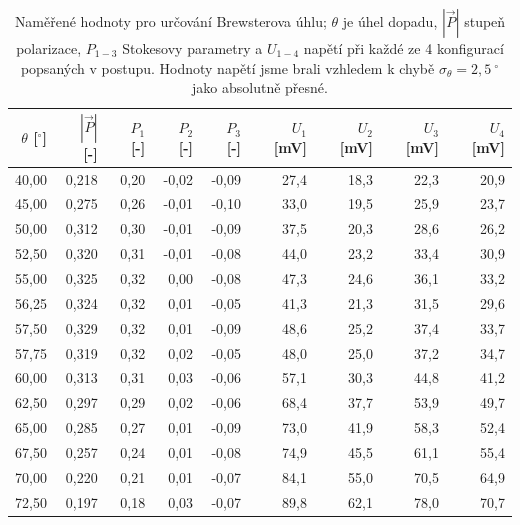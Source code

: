 \documentclass[english]{article}
\newcommand{\unit}[1]{\mathrm{#1}}
\begin{document}
		\begin{table}[htbp]
		  \centering
		    \begin{tabular}{|r|r|r|r|r|r|r|r|r|}
		    \hline
		    \boldmath{}\textbf{$\theta$ [$\unit{^\circ}$]}\unboldmath{} & \boldmath{}\textbf{$|\vec{P}|$ [-]}\unboldmath{} & \boldmath{}\textbf{$P_1$ [-]}\unboldmath{} & \boldmath{}\textbf{$P_2$ [-]}\unboldmath{} & \boldmath{}\textbf{$P_3$ [-]}\unboldmath{} & \boldmath{}\textbf{$U_1$ [mV]}\unboldmath{} & \boldmath{}\textbf{$U_2$ [mV]}\unboldmath{} & \boldmath{}\textbf{$U_3$ [mV]}\unboldmath{} & \boldmath{}\textbf{$U_4$ [mV]}\unboldmath{} \bigstrut\\
		    \hline
		    40,00 & 0,218 & 0,20  & -0,02 & -0,09 & 27,4  & 18,3  & 22,3  & 20,9 \bigstrut\\
		    \hline
		    45,00 & 0,275 & 0,26  & -0,01 & -0,10 & 33,0  & 19,5  & 25,9  & 23,7 \bigstrut\\
		    \hline
		    50,00 & 0,312 & 0,30  & -0,01 & -0,09 & 37,5  & 20,3  & 28,6  & 26,2 \bigstrut\\
		    \hline
		    52,50 & 0,320 & 0,31  & -0,01 & -0,08 & 44,0  & 23,2  & 33,4  & 30,9 \bigstrut\\
		    \hline
		    55,00 & 0,325 & 0,32  & 0,00  & -0,08 & 47,3  & 24,6  & 36,1  & 33,2 \bigstrut\\
		    \hline
		    56,25 & 0,324 & 0,32  & 0,01  & -0,05 & 41,3  & 21,3  & 31,5  & 29,6 \bigstrut\\
		    \hline
		    57,50 & 0,329 & 0,32  & 0,01  & -0,09 & 48,6  & 25,2  & 37,4  & 33,7 \bigstrut\\
		    \hline
		    57,75 & 0,319 & 0,32  & 0,02  & -0,05 & 48,0  & 25,0  & 37,2  & 34,7 \bigstrut\\
		    \hline
		    60,00 & 0,313 & 0,31  & 0,03  & -0,06 & 57,1  & 30,3  & 44,8  & 41,2 \bigstrut\\
		    \hline
		    62,50 & 0,297 & 0,29  & 0,02  & -0,06 & 68,4  & 37,7  & 53,9  & 49,7 \bigstrut\\
		    \hline
		    65,00 & 0,285 & 0,27  & 0,01  & -0,09 & 73,0  & 41,9  & 58,3  & 52,4 \bigstrut\\
		    \hline
		    67,50 & 0,257 & 0,24  & 0,01  & -0,08 & 74,9  & 45,5  & 61,1  & 55,4 \bigstrut\\
		    \hline
		    70,00 & 0,220 & 0,21  & 0,01  & -0,07 & 84,1  & 55,0  & 70,5  & 64,9 \bigstrut\\
		    \hline
		    72,50 & 0,197 & 0,18  & 0,03  & -0,07 & 89,8  & 62,1  & 78,0  & 70,7 \bigstrut\\
		    \hline
		    \end{tabular}%
		     \caption{Naměřené hodnoty pro určování Brewsterova úhlu; $\theta$ je úhel dopadu, $|\vec{P}|$ stupeň polarizace, $P_{1-3}$ Stokesovy parametry a $U_{1-4}$ napětí při každé ze 4 konfigurací popsaných v postupu. Hodnoty napětí jsme brali vzhledem k chybě $\sigma_\theta = 2,5~^\circ$ jako absolutně přesné.  }
		  \label{tab:brewsteruv_uhel}
		\end{table}%
		
\end{document}
